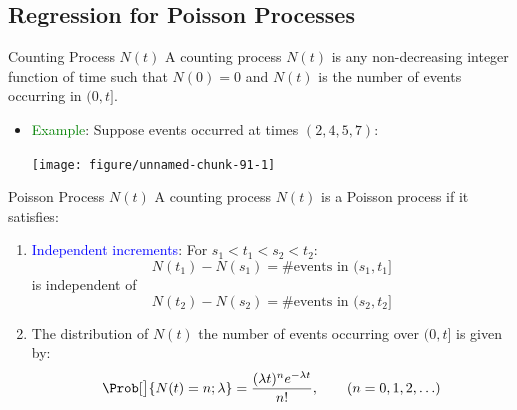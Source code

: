 \documentclass[oneside]{book}\usepackage[]{graphicx}\usepackage[svgnames]{xcolor}
\newenvironment{knitrout}{}{} %
\begin{document}
\subsection*{Regression for Poisson Processes}
\begin{Regular}{Counting Process $ N(t) $}
      A counting process $ N(t) $ is any non-decreasing integer function of time such that
      $ N(0)=0 $ and $ N(t) $ is the number of events occurring in $ (0,t] $.
\end{Regular}
\begin{itemize}
      \item \textcolor{Green}{Example}: Suppose events occurred at times $ (2,4,5,7) $:
\begin{knitrout}
\color{fgcolor}

{\centering \texttt{[image: figure/unnamed-chunk-91-1]} 

}


\end{knitrout}
\end{itemize}
\begin{Regular}{Poisson Process $ N(t) $}
      A counting process $ N(t) $ is a Poisson process if it satisfies:
      \begin{enumerate}[1.]
            \item \textcolor{Blue}{Independent increments}: For $ s_1<t_1<s_2<t_2 $:
                  \[ N(t_1)-N(s_1)=\text{\# events in $(s_1,t_1]$} \]
                  is independent of
                  \[ N(t_2)-N(s_2)=\text{\# events in $(s_2,t_2]$} \]
            \item The distribution of $ N(t) $ the number of events occurring over $ (0,t] $ is given by:
                  \[ \Prob[\big]{N(t)=n;\lambda}=\frac{(\lambda t)^n e^{-\lambda t}}{n!},\qquad (n=0,1,2,\ldots)  \]
      \end{enumerate}
\end{Regular}
\end{document}
